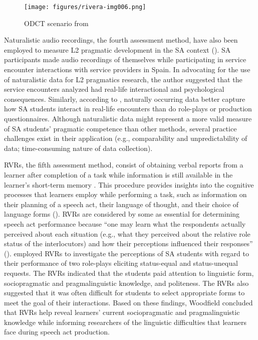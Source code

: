 \documentclass[output=paper]{langscibook}
\begin{document}
\begin{figure}
\caption{ODCT scenario from \citet{Hernándezinpress}}
\label{fig:4:1}
\texttt{[image: figures/rivera-img006.png]}
\end{figure}


Naturalistic audio recordings, the fourth assessment method, have also been employed to measure L2 pragmatic development in the SA context (\citealt{BatallerShively2011,Dings2014,Dufon1999,Shively2011,Shively2013,Shively2015}).  SA participants made audio recordings of themselves while participating in service encounter interactions with service providers in Spain. In advocating for the use of naturalistic data for L2 pragmatics research, the author suggested that the service encounters analyzed had real-life interactional and psychological consequences. Similarly, according to \citet{BatallerShively2011}, naturally occurring data better capture how SA students interact in real-life encounters than do role-plays or production questionnaires. Although naturalistic data might represent a more valid measure of SA students’ pragmatic competence than other methods, several practice challenges exist in their application (e.g., comparability and unpredictability of data; time-consuming nature of data collection).

RVRs, the fifth assessment method, consist of obtaining verbal reports from a learner after completion of a task while information is still available in the learner’s short-term memory \citep{Félix-Brasdefer2010}. This procedure provides insights into the cognitive processes that learners employ while performing a task, such as information on their planning of a speech act, their language of thought, and their choice of language forms (\citealt{Ren2014,Woodfield2012}). RVRs are considered by some as essential for determining speech act performance because “one may learn what the respondents actually perceived about each situation (e.g., what they perceived about the relative role status of the interlocutors) and how their perceptions influenced their responses” (\citealt[321]{Cohen2004}). \citet{Woodfield2012} employed RVRs to investigate the perceptions of SA students with regard to their performance of two role-plays eliciting status-equal and status-unequal requests. The RVRs indicated that the students paid attention to linguistic form, sociopragmatic and pragmalinguistic knowledge, and politeness. The RVRs also suggested that it was often difficult for students to select appropriate forms to meet the goal of their interactions. Based on these findings, Woodfield concluded that RVRs help reveal learners’ current sociopragmatic and pragmalinguistic knowledge while informing researchers of the linguistic difficulties that learners face during speech act production.
\end{document}
